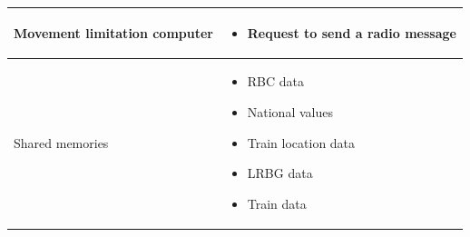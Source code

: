 \documentclass[nocc]{template/openetcs_report}
\begin{document}
\begin{longtable}{|l|l|}
				\hline	
									
					\begin{minipage}[t]{0.35\linewidth} Movement limitation computer	\end{minipage} 
				&	\begin{minipage}[t]{0.65\linewidth}
						\begin{itemize}
							\item Request to send a radio message
						\end{itemize}			
					\end{minipage} \\
				
				\hline										
				
					\begin{minipage}[t]{0.35\linewidth} Shared memories	\end{minipage} 
				&	\begin{minipage}[t]{0.65\linewidth}
						\begin{itemize}
							\item RBC data
							\item National values
							\item Train location data
							\item LRBG data
							\item Train data
						\end{itemize}				
					\end{minipage} \\
				
				\hline	
			\end{longtable}	
\end{document}
